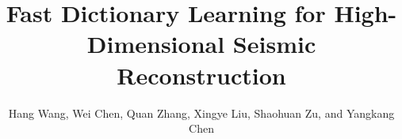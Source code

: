 
\title{Fast Dictionary Learning for High-Dimensional Seismic Reconstruction}
\author{Hang Wang\footnotemark[1], Wei Chen\footnotemark[2]\footnotemark[3], Quan Zhang\footnotemark[1], Xingye Liu\footnotemark[4], Shaohuan Zu\footnotemark[5], and Yangkang Chen\footnotemark[1]}

\renewcommand{\thefootnote}{\fnsymbol{footnote}}


\address{
\footnotemark[1]
School of Earth Sciences\\
Zhejiang University\\
Hangzhou, Zhejiang Province, China, 310027\\
\footnotemark[2]
Key Laboratory of Exploration Technology for Oil and Gas Resources\\
Ministry of Education\\
Yangtze University\\
\footnotemark[3]
Hubei Cooperative Innovation Center of Unconventional Oil and Gas\\
Yangtze University \\
\footnotemark[4]College of Geology and Environment\\
Shaanxi Provincial Key Laboratory of Geological Support for Coal Green Exploitation\\
Xi'an University of Science and Technology\\
\footnotemark[5] College of Geophysics\\
Chengdu University of Technology
}


\maketitle


